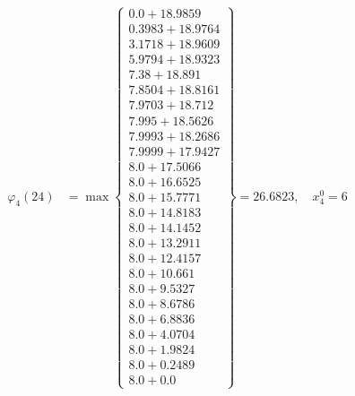 \documentclass{article}
\begin{document}
\begin{align*}
  
\varphi_{4}(24) &= \max \left\{ \begin{array}{c}
0.0 + 18.9859 \\
 0.3983 + 18.9764 \\
 3.1718 + 18.9609 \\
 5.9794 + 18.9323 \\
 7.38 + 18.891 \\
 7.8504 + 18.8161 \\
 7.9703 + 18.712 \\
 7.995 + 18.5626 \\
 7.9993 + 18.2686 \\
 7.9999 + 17.9427 \\
 8.0 + 17.5066 \\
 8.0 + 16.6525 \\
 8.0 + 15.7771 \\
 8.0 + 14.8183 \\
 8.0 + 14.1452 \\
 8.0 + 13.2911 \\
 8.0 + 12.4157 \\
 8.0 + 10.661 \\
 8.0 + 9.5327 \\
 8.0 + 8.6786 \\
 8.0 + 6.8836 \\
 8.0 + 4.0704 \\
 8.0 + 1.9824 \\
 8.0 + 0.2489 \\
 8.0 + 0.0
\end{array} \right\}=26.6823,\quad x_{4}^0=6\\
  
  
  

\end{align*}
\end{document}
